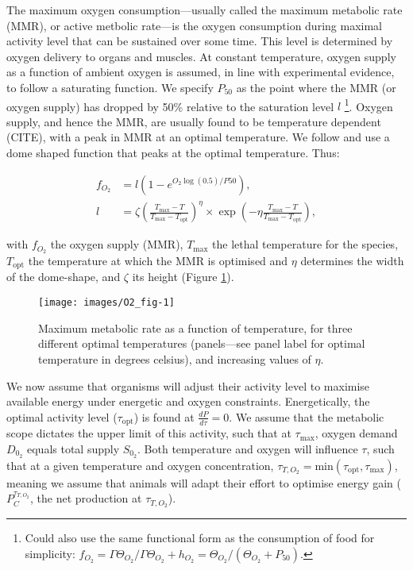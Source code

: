 \documentclass{article}\usepackage[]{graphicx}\usepackage[]{color}
\begin{document}
The maximum oxygen consumption---usually called the maximum metabolic rate (MMR), or active metbolic rate---is the oxygen consumption during maximal activity level that can be sustained over some time. This level is determined by oxygen delivery to organs and muscles. At constant temperature, oxygen supply as a function of ambient oxygen is assumed, in line with experimental evidence, to follow a saturating function. We specify $P_{50}$ as the point where the MMR (or oxygen supply) has dropped by 50\% relative to the saturation level $l$ \footnote{Could also use the same functional form as the consumption of food for simplicity: $f_{O_2} = \Gamma \Theta_{O_2}/\Gamma \Theta_{O_2} + h_{O_2} = \Theta_{O_2}/(\Theta_{O_2} + P_{50}).$}. Oxygen supply, and hence the MMR, are usually found to be temperature dependent (CITE), with a peak in MMR at an optimal temperature. We follow \cite{gnauck2013freshwater, lefrancois_influence_2003} and use a dome shaped function that peaks at the optimal temperature. Thus:

\begin{align}
f_{O_2}&=l(1-e^{O_2\log(0.5)/P50}),\\
l&=\zeta(\frac{T_{\text{max}}-T}{T_{\text{max}}-T_{\text{opt}}})^\eta \times \exp(-\eta\frac{T_{\text{max}}-T}{T_{\text{max}}-T_{\text{opt}}}),
\end{align}

with $f_{O_2}$ the oxygen supply (MMR), $T_{\text{max}}$ the lethal temperature for the species, $T_{\text{opt}}$ the temperature at which the MMR is optimised and $\eta$ determines the width of the dome-shape, and $\zeta$ its height (Figure \ref{fig:O2_fig}).



\begin{figure}
\texttt{[image: images/O2\_fig-1]} \caption[Maximum metabolic rate as a function of temperature, for three different optimal temperatures (panels---see panel label for optimal temperature in degrees celsius), and increasing values of ]{Maximum metabolic rate as a function of temperature, for three different optimal temperatures (panels---see panel label for optimal temperature in degrees celsius), and increasing values of $\eta$.}\label{fig:O2_fig}
\end{figure}



We now assume that organisms will adjust their activity level to maximise available energy under energetic and oxygen constraints. Energetically, the optimal activity level ($\tau_{\text{opt}}$) is found at $\frac{dP}{d\tau}=0$. We assume that the metabolic scope dictates the upper limit of this activity, such that at $\tau_{\text{max}}$, oxygen demand $D_{0_2}$ equals total supply $S_{0_2}$. Both temperature and oxygen will influence $\tau$, such that at a given temperature and oxygen concentration, $\tau_{T,O_2} = \text{min}\left( \tau_{\text{opt}},\tau_{\text{max}} \right)$, meaning we assume that animals will adapt their effort to optimise energy gain ($P_C^{\tau_{T,O_2}}$, the net production at $\tau_{T,O_2}$).
\end{document}
